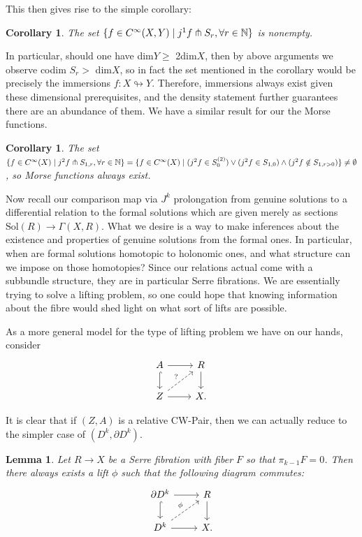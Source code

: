 \documentclass{article}
\newtheorem{lemma}[theorem]{Lemma}
\newtheorem{corollary}[theorem]{Corollary}
\newtheorem{proposed work}[theorem]{Proposed Work}
\begin{document}
This then gives rise to the simple corollary:

\begin{corollary}\label{thm:jettransimm}
The set $\{f \in C^\infty(X,Y) \mid j^1f \pitchfork S_r, \forall r \in \mathbb N\}$ is nonempty.
\end{corollary}

In particular, should one have dim$Y \ge $ 2dim$X$, then by above arguments we observe codim $S_r > $ dim$X$, so in fact the set mentioned in the corollary would be precisely the immersions $f:X \looparrowright Y$. Therefore, immersions always exist given these dimensional prerequisites, and the density statement further guarantees there are an abundance of them. We have a similar result for our the Morse functions.

\begin{corollary}\label{thm:jettransmorse}
The set $\{f \in C^\infty(X) \mid j^2f \pitchfork S_{1,r}, \forall r \in \mathbb N\} = \{f \in C^\infty(X) \mid (j^2f \in S^{(2)}_0) \vee (j^2f \in S_{1,0})\wedge(j^2f \notin S_{1,r>0}) \} \neq \emptyset$, so Morse functions always exist.
\end{corollary}

Now recall our comparison map via $J^k$ prolongation from genuine solutions to a differential relation to the formal solutions which are given merely as sections $\text{Sol}(R) \rightarrow \Gamma(X,R)$. What we desire is a way to make inferences about the existence and properties of genuine solutions from the formal ones. In particular, when are formal solutions homotopic to holonomic ones, and what structure can we impose on those homotopies? Since our relations actual come with a subbundle structure, they are in particular Serre fibrations. We are essentially trying to solve a lifting problem, so one could hope that knowing information about the fibre would shed light on what sort of lifts are possible.

As a more general model for the type of lifting problem we have on our hands, consider
\[
\begin{tikzcd}
A \arrow[r] \arrow[hookrightarrow]{d}
& R \arrow[d]
\\
Z \arrow[r] \arrow[dashed,ur,"?"]
& X.
\end{tikzcd}
\]

It is clear that if $(Z,A)$ is a relative CW-Pair, then we can actually reduce to the simpler case of $(D^k,\partial D^k)$.

\begin{lemma}
Let $R \rightarrow X$ be a Serre fibration with fiber $F$ so that $\pi_{k-1}F = 0$. Then there always exists a lift $\phi$ such that the following diagram commutes:
\[
\begin{tikzcd}
\partial D^k \arrow[r] \arrow[hookrightarrow]{d}
& R \arrow[d]
\\
D^k \arrow[r] \arrow[dashed,ur,"\phi"]
& X.
\end{tikzcd}
\]
\end{lemma}
\end{document}
